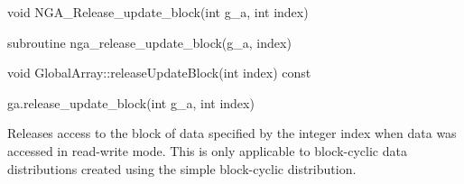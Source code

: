 \documentclass[10pt]{article}
\begin{document}


\begin{capi}
\begin{ccode}
void NGA_Release_update_block(int g_a, int index)
\end{ccode}
\begin{funcargs}
\end{funcargs}
\end{capi}

\begin{fapi}
\begin{fcode}
subroutine nga_release_update_block(g_a, index)
\end{fcode}
\begin{funcargs}
\end{funcargs}
\end{fapi}

\begin{cxxapi}
\begin{cxxcode}
void GlobalArray::releaseUpdateBlock(int index) const
\end{cxxcode}
\begin{funcargs}
\end{funcargs}
\end{cxxapi}

\begin{pyapi}
\begin{pycode}
ga.release_update_block(int g_a, int index)
\end{pycode}
\begin{funcargs}
\end{funcargs}
\end{pyapi}

\local

\begin{desc}

Releases access to the block of data specified by the integer index when data
was accessed in read-write mode. This is only applicable to block-cyclic data
distributions created using the simple block-cyclic distribution.

\end{desc}

\end{document}
